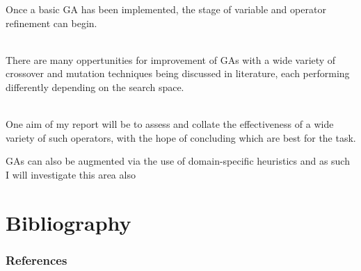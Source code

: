 \documentclass{beamer} \usepackage{pgfpages} \setbeamertemplate{bibliography item}{\insertbiblabel}
\begin{document}
\begin{frame}


    Once a basic GA has been implemented, the stage of variable and operator refinement can begin.
\\~\

    There are many oppertunities for improvement of GAs with a wide variety of crossover and mutation techniques being discussed in literature, each performing differently depending on the search space.
\\~\

    One aim of my report will be to assess and collate the effectiveness of a wide variety of such operators, with the hope of concluding which are best for the task. 

    GAs can also be augmented via the use of domain-specific heuristics and as such I will investigate this area also
\end{frame}

\section{Bibliography}
\begin{frame}[allowframebreaks]
\frametitle{References}


\end{frame}
\end{document}
